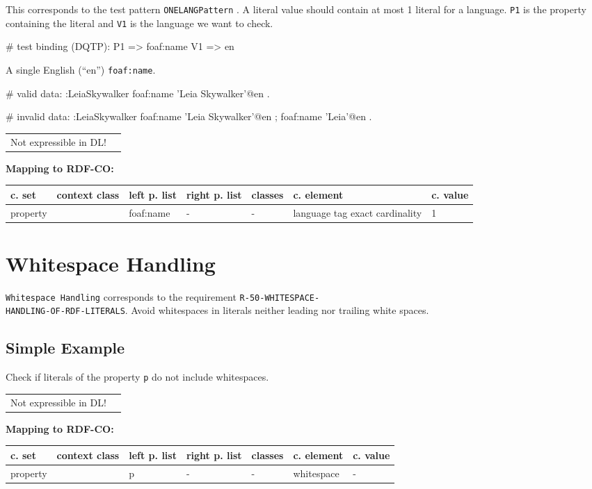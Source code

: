 \documentclass{llncs}
\newcommand{\ms}[1]{\texttt{#1}}
\newenvironment{gcotable}{
  \scriptsize
  \sffamily
  \vspace{0cm}
	\begin{center}
	\textbf{\vspace{0.4cm}Mapping to RDF-CO:} \\
  \begin{tabular}{l|l|l|l|l|l|l}
	\hline
  \textbf{c. set} & \textbf{context class} & \textbf{left p. list} & \textbf{right p. list} & \textbf{classes} & \textbf{c. element} & \textbf{c. value} \\
  \hline

}{
  \hline
  \end{tabular}
	\end{center}
}
\newenvironment{DL}{
\vspace{0cm}
	\begin{center}
  \begin{tabular}{r l}

}{
  \end{tabular}
	\end{center}
}
\begin{document}
This corresponds to the test pattern \ms{ONELANGPattern} \cite{Kontokostas2014}.
A literal value should contain at most 1 literal for a language. 
\ms{P1} is the property containing the literal and \ms{V1} is the language we want to check.

\begin{ex}
# test binding (DQTP):
P1 => foaf:name
V1 => en
\end{ex}

A single English (“en”) \ms{foaf:name}.

\begin{ex}
# valid data:
:LeiaSkywalker
    foaf:name 'Leia Skywalker'@en .
\end{ex}

\begin{ex}
# invalid data:
:LeiaSkywalker
    foaf:name 'Leia Skywalker'@en ;
    foaf:name 'Leia'@en .
\end{ex}

\begin{DL}
Not expressible in DL!
\end{DL}

\begin{gcotable}
property &  & foaf:name & - & - & language tag exact cardinality & 1 \\
\end{gcotable}

\section{Whitespace Handling}

\ms{Whitespace Handling} corresponds to the requirement
\ms{R-50-WHITESPACE-} \\
\ms{HANDLING-OF-RDF-LITERALS}.
Avoid whitespaces in literals neither leading nor trailing white spaces.

\subsection{Simple Example}

Check if literals of the property \ms{p} do not include whitespaces.

\begin{DL}
Not expressible in DL!
\end{DL}

\begin{gcotable}
property &  & p & - & - & whitespace & - \\
\end{gcotable}
\end{document}

